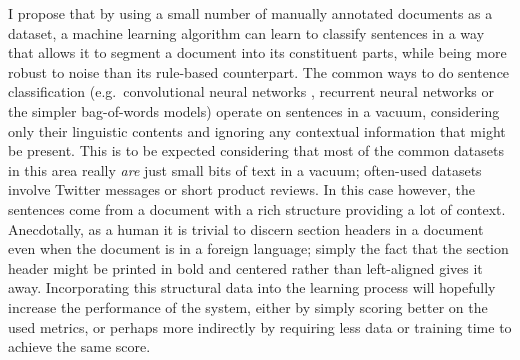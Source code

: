 I propose that by using a small number of manually annotated documents as a
dataset, a machine learning algorithm can learn to classify sentences in a way
that allows it to segment a document into its constituent parts, while being
more robust to noise than its rule-based counterpart. The common ways to do
sentence classification (e.g.\ convolutional neural networks \citep{kim2014conv}
, recurrent neural networks or the simpler bag-of-words models) operate on
sentences in a vacuum, considering only their linguistic contents and ignoring
any contextual information that might be present. This is to be expected
considering that most of the common datasets in this area really \emph{are} just
small bits of text in a vacuum; often-used datasets involve Twitter messages
or short product reviews. In this case however, the sentences come from a
document with a rich structure providing a lot of context. Anecdotally, as a
human it is trivial to discern section headers in a document even when the
document is in a foreign language; simply the fact that the section header might
be printed in bold and centered rather than left-aligned gives it away.
Incorporating this structural data into the learning process will hopefully
increase the performance of the system, either by simply scoring better on the
used metrics, or perhaps more indirectly by requiring less data or training time
to achieve the same score.

